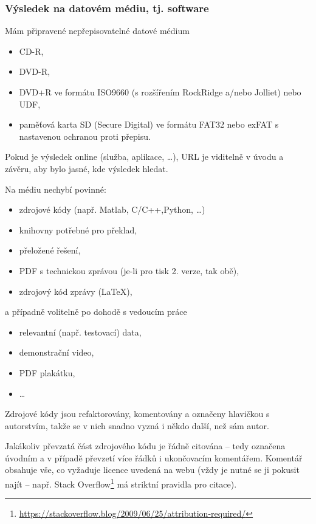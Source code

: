 \subsubsection*{Výsledek na datovém médiu, tj. software}
\begin{checklist}
	\item Mám připravené nepřepisovatelné datové médium
      \begin{itemize}
	  		\item CD-R,
            \item DVD-R,
            \item DVD+R ve formátu ISO9660 (s rozšířením RockRidge a/nebo Jolliet) nebo UDF,
            \item paměťová karta SD (Secure Digital) ve formátu FAT32 nebo exFAT s nastavenou ochranou proti přepisu.
      \end{itemize}
	\item Pokud je výsledek online (služba, aplikace, \dots), URL je viditelně v úvodu a závěru, aby bylo jasné, kde výsledek hledat.
	\item Na médiu nechybí povinné:
    	\begin{itemize}
    		\item zdrojové kódy (např. Matlab, C/C++,Python, \dots)
            \item knihovny potřebné pro překlad,
            \item přeložené řešení,
            \item PDF s technickou zprávou (je-li pro tisk 2. verze, tak obě),
            \item zdrojový kód zprávy (\LaTeX),
    	\end{itemize}
        a případně volitelně po dohodě s vedoucím práce
		\begin{itemize}
			\item relevantní (např. testovací) data,
            \item demonstrační video,
            \item PDF plakátku,
            \item \dots
		\end{itemize}
	\item Zdrojové kódy jsou refaktorovány, komentovány a označeny hlavičkou s autorstvím, takže se v nich snadno vyzná i někdo další, než sám autor.
    \item Jakákoliv převzatá část zdrojového kódu je řádně citována -- tedy označena úvodním a v případě převzetí více řádků i ukončovacím komentářem. Komentář obsahuje vše, co vyžaduje licence uvedená na webu (vždy je nutné se ji pokusit najít -- např. Stack Overflow\footnote{\url{https://stackoverflow.blog/2009/06/25/attribution-required/}} má striktní pravidla pro citace).
\end{checklist}

